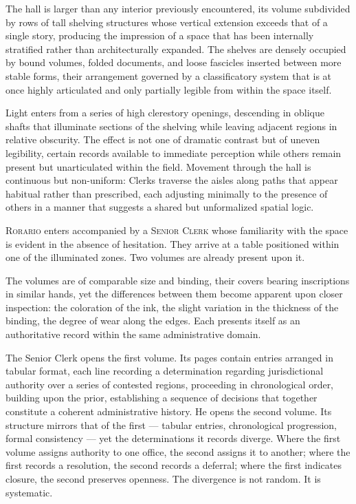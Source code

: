 \documentclass[12pt, oneside]{article}
\newcommand{\sceneheading}[1]{%
  \vspace{1.8em}%
  \noindent{\bfseries\large\MakeUppercase{#1}}%
  \vspace{0.6em}%
  \par\noindent{\color{rulecolor}\rule{\linewidth}{0.3pt}}%
  \vspace{0.5em}\par%
}
\newenvironment{action}{%
  \vspace{0.6em}%
  \noindent\ignorespaces%
}{%
  \par\vspace{0.6em}%
}
\begin{document}
\sceneheading{INT. Ecclesiastical Registry Hall — Day}

\begin{action}
The hall is larger than any interior previously encountered, its volume subdivided by rows of tall shelving structures whose vertical extension exceeds that of a single story, producing the impression of a space that has been internally stratified rather than architecturally expanded. The shelves are densely occupied by bound volumes, folded documents, and loose fascicles inserted between more stable forms, their arrangement governed by a classificatory system that is at once highly articulated and only partially legible from within the space itself.

Light enters from a series of high clerestory openings, descending in oblique shafts that illuminate sections of the shelving while leaving adjacent regions in relative obscurity. The effect is not one of dramatic contrast but of uneven legibility, certain records available to immediate perception while others remain present but unarticulated within the field. Movement through the hall is continuous but non-uniform: Clerks traverse the aisles along paths that appear habitual rather than prescribed, each adjusting minimally to the presence of others in a manner that suggests a shared but unformalized spatial logic.

\textsc{Rorario} enters accompanied by a \textsc{Senior Clerk} whose familiarity with the space is evident in the absence of hesitation. They arrive at a table positioned within one of the illuminated zones. Two volumes are already present upon it.
\end{action}

\begin{action}
The volumes are of comparable size and binding, their covers bearing inscriptions in similar hands, yet the differences between them become apparent upon closer inspection: the coloration of the ink, the slight variation in the thickness of the binding, the degree of wear along the edges. Each presents itself as an authoritative record within the same administrative domain.

The Senior Clerk opens the first volume. Its pages contain entries arranged in tabular format, each line recording a determination regarding jurisdictional authority over a series of contested regions, proceeding in chronological order, building upon the prior, establishing a sequence of decisions that together constitute a coherent administrative history. He opens the second volume. Its structure mirrors that of the first --- tabular entries, chronological progression, formal consistency --- yet the determinations it records diverge. Where the first volume assigns authority to one office, the second assigns it to another; where the first records a resolution, the second records a deferral; where the first indicates closure, the second preserves openness. The divergence is not random. It is systematic.
\end{action}
\end{document}
